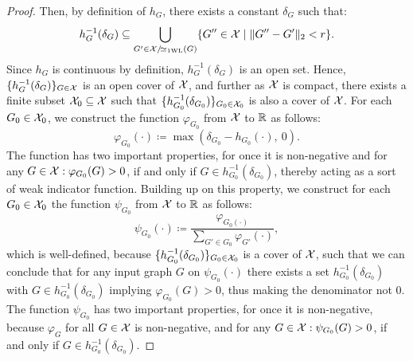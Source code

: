 \begin{proof}
    
    Then, by definition of $h_G$, there exists a constant $\delta_G$ such that:
    \begin{equation*}
        h_{G}^{-1}(\delta_G) \subseteq \bigcup_{G'\in \mathcal{X}/\!{\simeq_{\text{1WL}}}(G)} \{ G'' \in \mathcal{X} \mid \| G'' - G' \|_2 < r \}.
    \end{equation*}
    Since $h_G$ is continuous by definition, $h_{G}^{-1}(\delta_G)$ is an open set. Hence, $\{ h_{G}^{-1}(\delta_G) \}_{G \in \mathcal{X}}$ is an open cover of $\mathcal{X}$, and further as $\mathcal{X}$ is compact, there exists a finite subset $\mathcal{X}_0 \subseteq \mathcal{X}$ such that $\{ h_{G_0}^{-1}(\delta_{G_0}) \}_{G_0 \in \mathcal{X}_0}$ is also a cover of $\mathcal{X}$. For each $G_0 \in \mathcal{X}_0$, we construct the function $\varphi_{G_0}$ from $\mathcal{X}$ to $\mathbb{R}$ as follows:
    \begin{equation*}
        \varphi_{G_0} (\cdot) \coloneqq \max(\delta_{G_0} -  h_{G_0}(\cdot), \ 0).
    \end{equation*}
    The function has two important properties, for once it is non-negative and for any $G \in \mathcal{X}: \varphi_{G_0}(G) > 0$, if and only if $G \in h_{G_0}^{-1}(\delta_{G_0})$, thereby acting as a sort of weak indicator function. Building up on this property, we construct for each $G_0 \in \mathcal{X}_0$ the function $\psi_{G_0}$ from $\mathcal{X}$ to $\mathbb{R}$ as follows:
    \begin{equation*}
        \psi_{G_0}(\cdot) \coloneqq \frac{\varphi_{G_0(\cdot)}}{\sum_{G' \in G_0} \varphi_{G'}(\cdot)},
    \end{equation*}
    which is well-defined, because $\{ h_{G_0}^{-1}(\delta_{G_0}) \}_{G_0 \in \mathcal{X}_0}$ is a cover of $\mathcal{X}$, such that we can conclude that for any input graph $G$ on $\psi_{G_0}(\cdot)$ there exists a set $h_{G_0}^{-1}(\delta_{G_0})$ with $G \in h_{G_0}^{-1}(\delta_{G_0})$ implying $\varphi_{G_0}(G) > 0$, thus making the denominator not $0$. The function $\psi_{G_0}$ has two important properties, for once it is non-negative, because $\varphi_{G}$ for all $G \in \mathcal{X}$ is non-negative, and for any $G \in \mathcal{X}: \psi_{G_0}(G) > 0$, if and only if $G \in h_{G_0}^{-1}(\delta_{G_0})$.


\end{proof}
